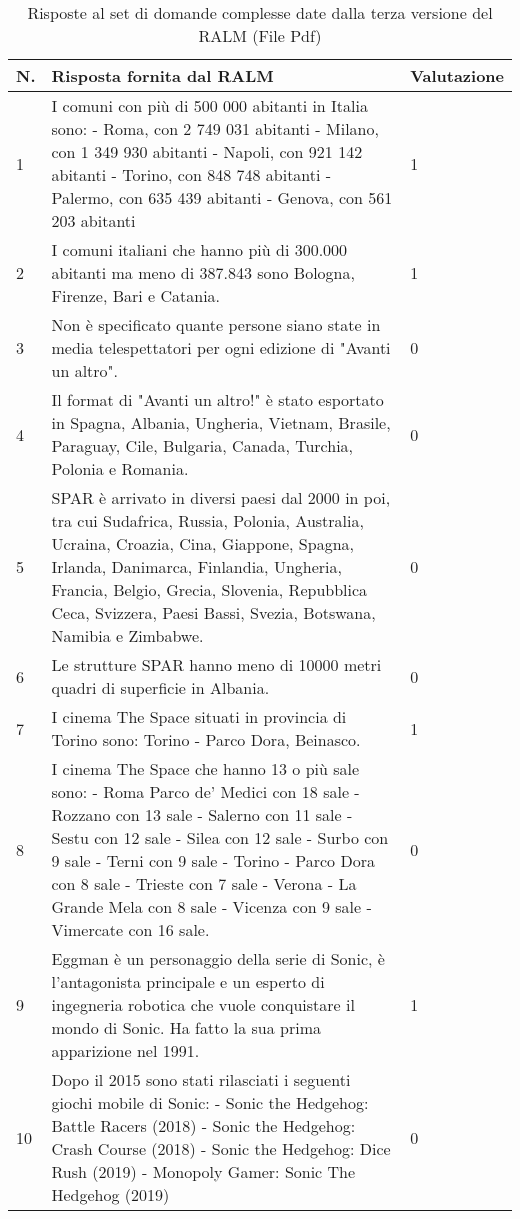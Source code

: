 \begin{table}[H]
    \centering
    \begin{tabular}{|p{0.5cm} |p{6cm} |p{2cm}|}
        \hline
        \textbf{N}. & \textbf{Risposta fornita dal RALM} & \textbf{Valutazione} \\
        \hline
        1 & I comuni con più di 500 000 abitanti in Italia sono: 
        - Roma, con 2 749 031 abitanti 
        - Milano, con 1 349 930 abitanti 
        - Napoli, con 921 142 abitanti 
        - Torino, con 848 748 abitanti 
        - Palermo, con 635 439 abitanti 
        - Genova, con 561 203 abitanti & 1 \\
        \hline
        2 & I comuni italiani che hanno più di 300.000 abitanti ma meno di 387.843 sono Bologna, Firenze, Bari e Catania. & 1 \\
        \hline
        3 & Non è specificato quante persone siano state in media telespettatori per ogni edizione di "Avanti un altro". & 0 \\
        \hline
        4 & Il format di "Avanti un altro!" è stato esportato in Spagna, Albania, Ungheria, Vietnam, Brasile, Paraguay, Cile, Bulgaria, Canada, Turchia, Polonia e Romania. & 0 \\
        \hline
        5 & SPAR è arrivato in diversi paesi dal 2000 in poi, tra cui Sudafrica, Russia, Polonia, Australia, Ucraina, Croazia, Cina, Giappone, Spagna, Irlanda, Danimarca, Finlandia, Ungheria, Francia, Belgio, Grecia, Slovenia, Repubblica Ceca, Svizzera, Paesi Bassi, Svezia, Botswana, Namibia e Zimbabwe. & 0 \\
        \hline
        6 & Le strutture SPAR hanno meno di 10000 metri quadri di superficie in Albania. & 0 \\
        \hline
        7 & I cinema The Space situati in provincia di Torino sono: Torino - Parco Dora, Beinasco. & 1 \\
        \hline
        8 & I cinema The Space che hanno 13 o più sale sono:
        - Roma Parco de' Medici con 18 sale
        - Rozzano con 13 sale
        - Salerno con 11 sale
        - Sestu con 12 sale
        - Silea con 12 sale
        - Surbo con 9 sale
        - Terni con 9 sale
        - Torino - Parco Dora con 8 sale
        - Trieste con 7 sale
        - Verona - La Grande Mela con 8 sale
        - Vicenza con 9 sale
        - Vimercate con 16 sale. & 0 \\
        \hline
        9 & Eggman è un personaggio della serie di Sonic, è l'antagonista principale e un esperto di ingegneria robotica che vuole conquistare il mondo di Sonic. Ha fatto la sua prima apparizione nel 1991. & 1 \\
        \hline
        10 & Dopo il 2015 sono stati rilasciati i seguenti giochi mobile di Sonic:
        - Sonic the Hedgehog: Battle Racers (2018)
        - Sonic the Hedgehog: Crash Course (2018)
        - Sonic the Hedgehog: Dice Rush (2019)
        - Monopoly Gamer: Sonic The Hedgehog (2019) & 0 \\
        \hline
    \end{tabular}
    \caption{Risposte al set di domande complesse date dalla terza versione del RALM (File Pdf)}
\end{table}

